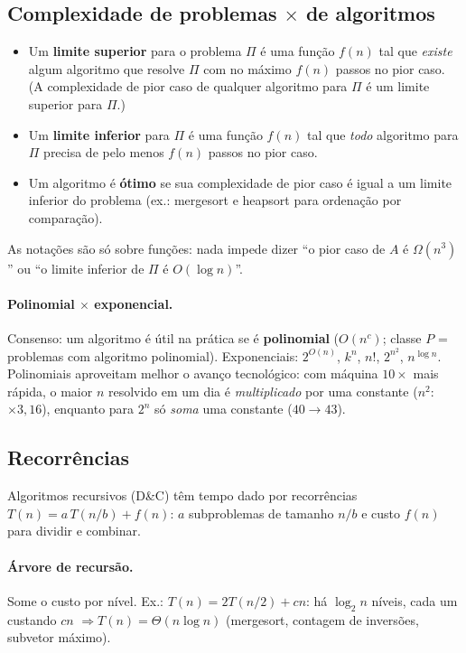 \subsection{Complexidade de problemas $\times$ de algoritmos}
\begin{defi}\leavevmode
\begin{itemize}
  \item Um \textbf{limite superior} para o problema $\Pi$ é uma função $f(n)$ tal que \emph{existe} algum algoritmo que resolve $\Pi$ com no máximo $f(n)$ passos no pior caso. (A complexidade de pior caso de qualquer algoritmo para $\Pi$ é um limite superior para $\Pi$.)
  \item Um \textbf{limite inferior} para $\Pi$ é uma função $f(n)$ tal que \emph{todo} algoritmo para $\Pi$ precisa de pelo menos $f(n)$ passos no pior caso.
  \item Um algoritmo é \textbf{ótimo} se sua complexidade de pior caso é igual a um limite inferior do problema (ex.: mergesort e heapsort para ordenação por comparação).
\end{itemize}
\end{defi}
As notações são só sobre funções: nada impede dizer ``o pior caso de $A$ é $\Omega(n^3)$'' ou ``o limite inferior de $\Pi$ é $O(\log n)$''.

\paragraph{Polinomial $\times$ exponencial.} Consenso: um algoritmo é útil na prática se é \textbf{polinomial} ($O(n^c)$; classe $P$ = problemas com algoritmo polinomial). Exponenciais: $2^{O(n)}$, $k^n$, $n!$, $2^{n^2}$, $n^{\log n}$. Polinomiais aproveitam melhor o avanço tecnológico: com máquina $10\times$ mais rápida, o maior $n$ resolvido em um dia é \emph{multiplicado} por uma constante ($n^2$: $\times 3{,}16$), enquanto para $2^n$ só \emph{soma} uma constante ($40\to 43$).

\subsection{Recorrências}\label{sec:recorrencias}
Algoritmos recursivos (D\&C) têm tempo dado por recorrências $T(n)=a\,T(n/b)+f(n)$: $a$ subproblemas de tamanho $n/b$ e custo $f(n)$ para dividir e combinar.

\paragraph{Árvore de recursão.} Some o custo por nível. Ex.: $T(n)=2T(n/2)+cn$: há $\log_2 n$ níveis, cada um custando $cn$ $\Rightarrow T(n)=\Theta(n\log n)$ (mergesort, contagem de inversões, subvetor máximo).

